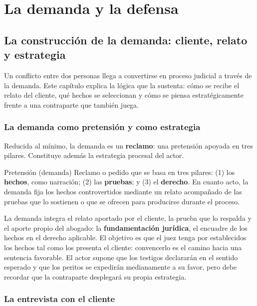 \documentclass[12pt,oneside]{book}
\begin{document}
\part{La demanda y la defensa}

\chapter{La construcción de la demanda: cliente, relato y estrategia}\label{cap:construccion}

Un conflicto entre dos personas llega a convertirse en proceso judicial a través de la demanda. Este capítulo explica la lógica que la sustenta: cómo se recibe el relato del cliente, qué hechos se seleccionan y cómo se piensa estratégicamente frente a una contraparte que también juega.

\section{La demanda como pretensión y como estrategia}

Reducida al mínimo, la demanda es un \textbf{reclamo}: una pretensión apoyada en tres pilares. Constituye además la estrategia procesal del actor.

\begin{definicion}{Pretensión (demanda)}
Reclamo o pedido que se basa en tres pilares: (1) los \textbf{hechos}, como narración; (2) las \textbf{pruebas}; y (3) el \textbf{derecho}. En cuanto acto, la demanda fija los hechos controvertidos mediante un relato acompañado de las pruebas que lo sostienen o que se ofrecen para producirse durante el proceso.
\end{definicion}

La demanda integra el relato aportado por el cliente, la prueba que lo respalda y el aporte propio del abogado: la \textbf{fundamentación jurídica}, el encuadre de los hechos en el derecho aplicable. El objetivo es que el juez tenga por establecidos los hechos tal como los presenta el cliente: convencerlo es el camino hacia una sentencia favorable. El actor supone que los testigos declararán en el sentido esperado y que los peritos se expedirán medianamente a su favor, pero debe recordar que la contraparte desplegará su propia estrategia.

\section{La entrevista con el cliente}
\end{document}
